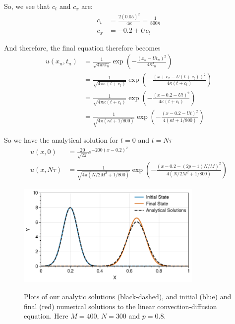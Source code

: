 \begin{enumerate}[label=(\roman*),leftmargin=*,itemsep=0mm]
    So, we see that $c_t$ and $c_x$ are:
    \begin{align*}
        c_t &= \frac{2(0.05)^2}{4\kappa} = \frac{1}{800\kappa} \\
        c_x &= -0.2 + Uc_t
    \end{align*}
    
    And therefore, the final equation therefore becomes
    \begin{align*}
        u(x_n,t_n) &= \frac{1}{\sqrt{4\pi\kappa t_n}}
        \exp(-\frac{(x_n-Ut_n)^2}{4\kappa t_n}) \\
        &= \frac{1}{\sqrt{4\pi\kappa (t+c_t)}}
        \exp(-\frac{(x + c_x - U(t + c_t))^2}{4\kappa (t+c_t)}) \\
        &= \frac{1}{\sqrt{4\pi\kappa (t+c_t)}}
        \exp(-\frac{(x - 0.2 - Ut)^2}{4\kappa (t+c_t)})  \\
        &= \frac{1}{\sqrt{4\pi(\kappa t + 1/800)}}
        \exp(-\frac{(x - 0.2 - Ut)^2}{4(\kappa t + 1/800)})
    \end{align*}
    
    So we have the analytical solution for $t=0$ and $t=N\tau$
    \begin{align*}
        u(x,0) &= \frac{20}{\sqrt{2\pi}} e^{-200(x - 0.2)^2} \\
        u(x,N\tau)
        &= \frac{1}{\sqrt{4\pi(N/2M^2 + 1/800)}}
        \exp(-\frac{(x - 0.2 - (2p-1)N/M)^2}{4(N/2M^2 + 1/800)})
    \end{align*}
    
    \begin{figure}[h!]
    \centering
    \includegraphics[width=0.8\textwidth]{figures/hw1_qn3.png}\\
    \caption{Plots of our analytic solutions (black-dashed), and initial (blue) and final (red) numerical solutions to the linear convection-diffusion equation.  Here $M=400$, $N=300$ and $p=0.8$.}
    \label{hw1_qn3}
\end{figure}
    
\end{enumerate}